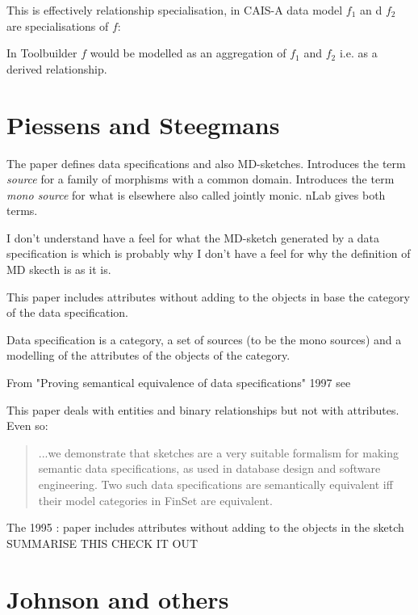 \documentclass[11pt,a4paper]{scrartcl}
\renewcommand{\erpictureFolder}[0]{../SharedPictures}
\begin{document}
This is effectively relationship specialisation, in CAIS-A
 data model $f_1$ an d $f_2$ are specialisations of $f$: 

\begin{center}

\end{center}
In Toolbuilder $f$ would be modelled as an aggregation of $f_1$ and $f_2$ i.e. as 
a derived relationship.

\section {Piessens and Steegmans}


The paper \cite{piessens1995} defines data specifications and also MD-sketches.
Introduces the term \textit{source} for a family of morphisms with a common domain.
Introduces the term \textit{mono source} 	for what is elsewhere also called jointly monic. nLab gives both terms.

I don't understand have a feel for what the MD-sketch generated by a data specification is which is probably why I don't have a feel for why the definition of MD skecth is as it is. 

This paper includes attributes without adding to the objects in base the category of the data specification.

Data specification is a category, a set of sources (to be the mono sources) and a modelling of the attributes of the objects of the category.


From "Proving semantical equivalence of data specifications" 1997 see \cite{piessens1997}

This paper deals with entities and binary relationships but not with attributes. Even so:
\begin{quote}
...we demonstrate that sketches are a very suitable
formalism for making semantic data specifications, as used in database design and software
engineering. Two such data specifications are semantically equivalent iff their model categories in
FinSet are equivalent. 
\end{quote}

The 1995 : \cite{piessens1995}
paper includes attributes without adding to the objects in the sketch SUMMARISE THIS CHECK IT OUT





\section {Johnson and others}
\end{document}
